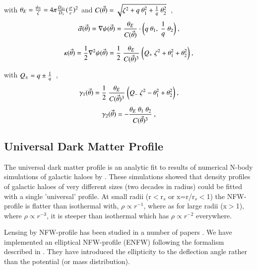 \documentclass[useAMS,usenatbib]{mn2e}
\newcounter{two}   \setcounter{two}{2}
\begin{document}
with  $\theta_{E}={\psi_{0}\over\zeta}=4\pi {D_{ds}\over D_s}({\sigma
  \over c})^2$ and $C(\vec{\theta})=\sqrt{\zeta^{2}+q\ \theta_1^{2}+{1\over q}\ \theta_2^{2}}$\ ,\\

\begin{equation}
  \vec{\alpha}(\vec{\theta})=\nabla\psi(\vec{\theta})={\theta_{E} \over C(\vec{\theta})
  }\cdot \bigg(q\ \theta_1,\ {1\over q}\ \theta_2\bigg)\ ,
\end{equation}

\begin{equation}
  \kappa(\vec{\theta}) = {1\over2}\nabla^{2} \psi(\vec{\theta})={1\over2}\ {\theta_{E}\over
    C(\vec{\theta})^3}\ \bigg(Q_{+}\ \zeta^2+\theta_1^2+\theta_2^2\bigg)\ ,
\end{equation}

with $Q_{\pm}=q\pm{1\over q}$\ ,\\

\begin{equation}
  \gamma_1(\vec{\theta})={1\over2}\ {\theta_{E}\over C(\vec{\theta})^3}\ \bigg({Q_{-}}\ \zeta^2-\theta_1^2+\theta_2^2\bigg)\ ,
\end{equation}
\begin{equation}
  \gamma_2(\vec{\theta})=-{\theta_{E}\ \theta_1\ \theta_2\over C(\vec{\theta})^3}\ ,
\end{equation}


\subsection{Universal Dark Matter Profile}

The universal dark matter profile is an analytic fit to results of
numerical N-body simulations of galactic haloes by
\citet{navarro:96}. These simulations showed that density profiles of
galactic haloes of very different sizes (two decades in radius) could
be fitted with a single 'universal' profile. At small radii (r$<$r$_s$
or x=r/r$_s<$1) the NFW-profile is flatter than isothermal with,
$\rho\propto r^{-1}$, where as for large radii (x$>$1), where $\rho\propto
r^{-3}$, it is steeper than isothermal which has $\rho\propto r^{-2}$
everywhere.

Lensing by NFW-profile has been studied in a number of papers
\citep[e.g.][]{bartelmann:96,wright:00,golse:02b}. We have implemented
an elliptical NFW-profile (ENFW) following the formalism described in
\citet{meneghetti:03}. They have introduced the ellipticity to the
deflection angle rather than the potential (or mass distribution).
\end{document}
